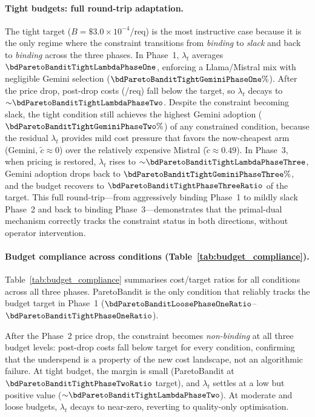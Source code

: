 \paragraph{Tight budgets: full round-trip adaptation.}
The tight target ($B{=}\$3.0{\times}10^{-4}$/req) is the most
instructive case because it is the only regime where the
constraint transitions from \emph{binding} to \emph{slack} and
back to \emph{binding} across the three phases.
In Phase~1, $\lambda_t$ averages
$\bdParetoBanditTightLambdaPhaseOne$, enforcing a Llama/Mistral
mix with negligible Gemini selection
($\bdParetoBanditTightGeminiPhaseOne\%$).
After the price drop, post-drop costs
(\bdParetoBanditTightPhaseTwoCost/req) fall below the target,
so $\lambda_t$ decays to
${\sim}\bdParetoBanditTightLambdaPhaseTwo$.
Despite the constraint becoming slack, the tight condition
still achieves the highest Gemini adoption
($\bdParetoBanditTightGeminiPhaseTwo\%$) of any constrained
condition, because the residual $\lambda_t$ provides mild cost
pressure that favors the now-cheapest arm (Gemini,
$\tilde{c}{\approx}0$) over the relatively expensive Mistral
($\tilde{c}{\approx}0.49$).
In Phase~3, when pricing is restored, $\lambda_t$ rises to
${\sim}\bdParetoBanditTightLambdaPhaseThree$, Gemini adoption
drops back to $\bdParetoBanditTightGeminiPhaseThree\%$, and the
budget recovers to $\bdParetoBanditTightPhaseThreeRatio$ of the
target.
This full round-trip---from aggressively binding Phase~1 to
mildly slack Phase~2 and back to binding Phase~3---demonstrates
that the primal-dual mechanism correctly tracks the constraint
status in both directions, without operator intervention.

\paragraph{Budget compliance across conditions
(Table~\ref{tab:budget_compliance}).}
Table~\ref{tab:budget_compliance} summarises cost/target ratios
for all conditions across all three phases.
ParetoBandit is the only condition that reliably tracks the budget
target in Phase~1 ($\bdParetoBanditLoosePhaseOneRatio$--$\bdParetoBanditTightPhaseOneRatio$).

After the Phase~2 price drop, the constraint becomes
\emph{non-binding} at all three budget levels: post-drop costs
fall below target for every condition, confirming that the
underspend is a property of the new cost landscape, not an
algorithmic failure.
At tight budget, the margin is small (ParetoBandit at
$\bdParetoBanditTightPhaseTwoRatio$ target), and $\lambda_t$
settles at a low but positive value
(${\sim}\bdParetoBanditTightLambdaPhaseTwo$).
At moderate and loose budgets, $\lambda_t$ decays to near-zero,
reverting to quality-only optimisation.

